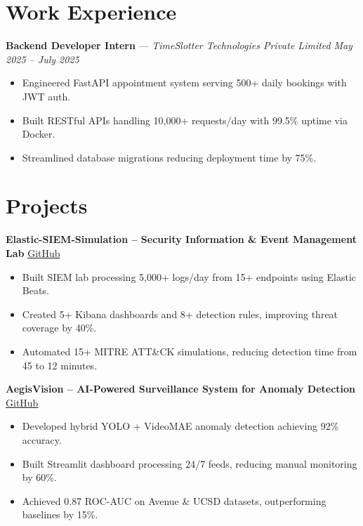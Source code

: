 \documentclass[a4paper,10pt]{article}
\begin{document}
\section{Work Experience}
\vspace{4pt}
\textbf{Backend Developer Intern} — \textit{TimeSlotter Technologies Private Limited} \hfill \textit{May 2025 -- July 2025}
\vspace{6pt}
\begin{itemize}
    \item Engineered FastAPI appointment system serving 500+ daily bookings with JWT auth.
    \item Built RESTful APIs handling 10,000+ requests/day with 99.5\% uptime via Docker.
    \item Streamlined database migrations reducing deployment time by 75\%.
\end{itemize}

\section{Projects}
\vspace{4pt}
\textbf{Elastic-SIEM-Simulation – Security Information \& Event Management Lab} \hfill \href{https://github.com/Ome9/Elastic-SIEM-Simulation}{GitHub}
\vspace{6pt}
\begin{itemize}
    \item Built SIEM lab processing 5,000+ logs/day from 15+ endpoints using Elastic Beats.
    \item Created 5+ Kibana dashboards and 8+ detection rules, improving threat coverage by 40\%.
    \item Automated 15+ MITRE ATT\&CK simulations, reducing detection time from 45 to 12 minutes.
\end{itemize}
\vspace{5pt}

\textbf{AegisVision – AI-Powered Surveillance System for Anomaly Detection} \hfill \href{https://github.com/Ome9/AEGISVISION}{GitHub}
\vspace{6pt}
\begin{itemize}
    \item Developed hybrid YOLO + VideoMAE anomaly detection achieving 92\% accuracy.
    \item Built Streamlit dashboard processing 24/7 feeds, reducing manual monitoring by 60\%.
    \item Achieved 0.87 ROC-AUC on Avenue \& UCSD datasets, outperforming baselines by 15\%.
\end{itemize}
\vspace{5pt}
\end{document}
